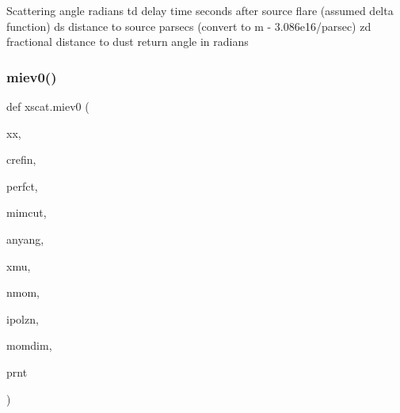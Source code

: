 \begin{DoxyVerb}Scattering angle radians
    td    delay time seconds after source flare (assumed delta function)
    ds    distance to source parsecs (convert to m - 3.086e16/parsec)
    zd    fractional distance to dust 
return    angle in radians
\end{DoxyVerb}
 \mbox{\label{namespacexscat_af5ec8b4518632d40c829f6671d5ba4e0}} 
\subsubsection{\texorpdfstring{miev0()}{miev0()}}
{\footnotesize\ttfamily def xscat.\+miev0 (\begin{DoxyParamCaption}\item[{}]{xx,  }\item[{}]{crefin,  }\item[{}]{perfct,  }\item[{}]{mimcut,  }\item[{}]{anyang,  }\item[{}]{xmu,  }\item[{}]{nmom,  }\item[{}]{ipolzn,  }\item[{}]{momdim,  }\item[{}]{prnt }\end{DoxyParamCaption})}

